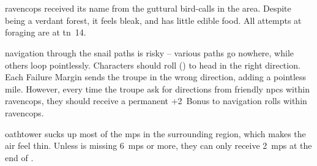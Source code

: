 \section{}
\label{ravencops}

\Gls{ravencops} received its name from the guttural bird-calls in the area.
Despite being a verdant forest, it feels bleak, and has little edible food.
All attempts at \gls{foraging} are at \gls{tn}~14.

\Gls{navigation} through the snail paths is risky -- various paths go nowhere, while others loop pointlessly.
Characters should roll  (\tn[10]) to head in the right direction.
Each Failure Margin sends the troupe in the wrong direction, adding a pointless mile.
However, every time the troupe ask for directions from friendly \glspl{npc} within \gls{ravencops}, they should receive a permanent +2~Bonus to \gls{navigation} rolls within \gls{ravencops}.

\Gls{oathtower} sucks up most of the \glspl{mp} in the surrounding \gls{region}, which makes the air feel thin.
Unless  is missing 6~\glspl{mp} or more, they can only receive 2~\glspl{mp} at the end of .%



